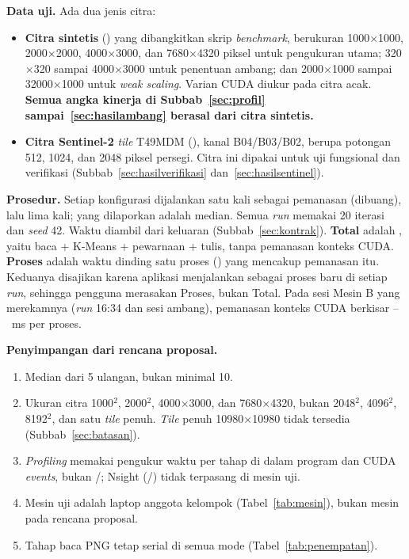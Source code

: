 \textbf{Data uji.} Ada dua jenis citra:
\begin{itemize}
    \item \textbf{Citra sintetis} () yang dibangkitkan skrip \emph{benchmark}, berukuran 1000$\times$1000, 2000$\times$2000, 4000$\times$3000, dan 7680$\times$4320 piksel untuk pengukuran utama; 320$\times$320 sampai 4000$\times$3000 untuk penentuan ambang; dan 2000$\times$1000 sampai 32000$\times$1000 untuk \emph{weak scaling}. Varian CUDA diukur pada citra acak. \textbf{Semua angka kinerja di Subbab~\ref{sec:profil} sampai~\ref{sec:hasilambang} berasal dari citra sintetis.}
    \item \textbf{Citra Sentinel-2} \emph{tile} T49MDM (), kanal B04/B03/B02, berupa potongan 512, 1024, dan 2048 piksel persegi. Citra ini dipakai untuk uji fungsional dan verifikasi (Subbab~\ref{sec:hasilverifikasi} dan~\ref{sec:hasilsentinel}).
\end{itemize}

\textbf{Prosedur.} Setiap konfigurasi dijalankan satu kali sebagai pemanasan (dibuang), lalu lima kali; yang dilaporkan adalah median. Semua \emph{run} memakai 20 iterasi dan \emph{seed} 42. Waktu diambil dari  keluaran  (Subbab~\ref{sec:kontrak}). \textbf{Total} adalah , yaitu baca + K-Means + pewarnaan + tulis, tanpa pemanasan konteks CUDA. \textbf{Proses} adalah waktu dinding satu proses  () yang mencakup pemanasan itu. Keduanya disajikan karena aplikasi menjalankan  sebagai proses baru di setiap \emph{run}, sehingga pengguna merasakan Proses, bukan Total. Pada sesi Mesin B yang merekamnya (\emph{run} 16:34 dan sesi ambang), pemanasan konteks CUDA berkisar \WarmMin--\WarmMax~ms per proses.

\textbf{Penyimpangan dari rencana proposal.}
\begin{enumerate}
    \item Median dari 5 ulangan, bukan minimal 10.
    \item Ukuran citra 1000$^2$, 2000$^2$, 4000$\times$3000, dan 7680$\times$4320, bukan 2048$^2$, 4096$^2$, 8192$^2$, dan satu \emph{tile} penuh. \emph{Tile} penuh 10980$\times$10980 tidak tersedia (Subbab~\ref{sec:batasan}).
    \item \emph{Profiling} memakai pengukur waktu per tahap di dalam program dan CUDA \emph{events}, bukan /; Nsight (/) tidak terpasang di mesin uji.
    \item Mesin uji adalah laptop anggota kelompok (Tabel~\ref{tab:mesin}), bukan mesin pada rencana proposal.
    \item Tahap baca PNG tetap serial di semua mode (Tabel~\ref{tab:penempatan}).
\end{enumerate}

